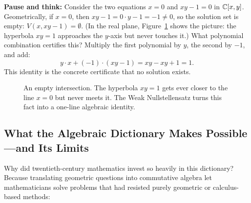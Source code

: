 \begin{recoverybox}
\textbf{Pause and think:} Consider the two equations $x = 0$ and $xy - 1 = 0$ in $\mathbb{C}[x, y]$. Geometrically, if $x = 0$, then $xy - 1 = 0 \cdot y - 1 = -1 \neq 0$, so the solution set is empty: $V(x, xy - 1) = \emptyset$. (In the real plane, Figure~\ref{alggeom:fig-hyperbola-axis} shows the picture: the hyperbola $xy = 1$ approaches the $y$-axis but never touches it.) What polynomial combination certifies this? Multiply the first polynomial by $y$, the second by $-1$, and add:
\[
y \cdot x + (-1) \cdot (xy - 1) = xy - xy + 1 = 1.
\]
This identity is the concrete certificate that no solution exists.
\end{recoverybox}

\begin{figure}[htbp]
\centering
{}
\caption{An empty intersection. The hyperbola $xy = 1$ gets ever closer to the line $x = 0$ but never meets it. The Weak Nullstellensatz turns this fact into a one-line algebraic identity.}\label{alggeom:fig-hyperbola-axis}
\end{figure}

\subsection{What the Algebraic Dictionary Makes Possible---and Its Limits}

Why did twentieth-century mathematics invest so heavily in this dictionary? Because translating geometric questions into commutative algebra let mathematicians solve problems that had resisted purely geometric or calculus-based methods:

